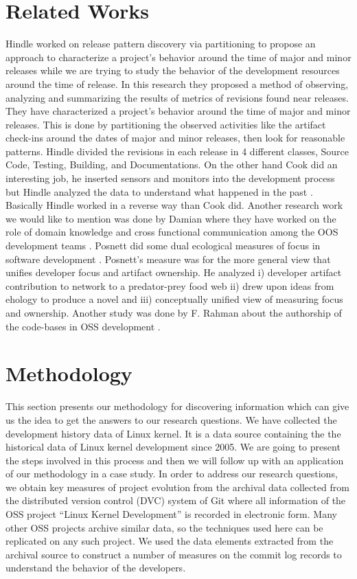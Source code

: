 \documentclass{acm_proc_article-sp}
\begin{document}
\section{Related Works}
Hindle worked on release pattern discovery via partitioning \cite{hindle_release_pattern} to propose an approach to characterize a project's behavior around the time of major and minor releases while we are trying to study the behavior of the development resources around the time of release. In this research they proposed a method of observing, analyzing and summarizing the results of metrics of revisions found near releases. They have characterized a project's behavior around the time of major and minor releases. This is done by partitioning the observed activities like the artifact check-ins around the dates of major and minor releases, then look for reasonable patterns. Hindle divided the revisions in each release in 4 different classes, Source Code, Testing, Building, and Documentations. On the other hand Cook did an interesting job, he inserted sensors and monitors into the development process but Hindle analyzed the data to understand what happened in the past \cite{cook_automating}. Basically Hindle worked in a reverse way than Cook did. Another research work we would like to mention was done by  Damian where they have worked on the role of domain knowledge and cross functional communication among the OOS development teams \cite{damian_domain}. Posnett did some dual ecological measures of focus in software development \cite{posnett_ecological}. Posnett's measure was for the more general view that unifies developer focus and artifact ownership. He analyzed i) developer artifact contribution to network to a predator-prey food web ii) drew upon ideas from ehology to produce a novel and iii) conceptually unified view of measuring focus and ownership. Another study was done by F. Rahman about the authorship of the code-bases in OSS development \cite{rahman_ownership}.

\section{Methodology}
This section presents our methodology for discovering information which can give us the idea to get the answers to our research questions. We have collected the development history data of Linux kernel. It is a data source containing the the historical data of Linux kernel development since 2005. We are going to present the steps involved in this process and then we will follow up with an application of our methodology in a case study. In order to address our research questions, we obtain key measures of project evolution from the archival data collected from the distributed version control (DVC) system of Git where all information of the OSS project ``Linux Kernel Development'' is recorded in electronic form. Many other OSS projects archive similar data, so the techniques used here can be replicated on any such project. We used the data elements extracted from the archival source to construct a number of measures on the commit log records to understand the behavior of the developers.
\end{document}
